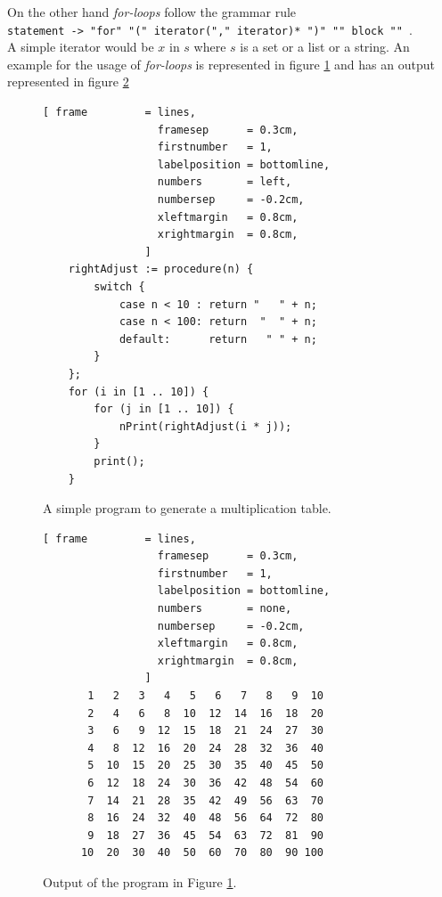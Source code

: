 \documentclass[11pt]{article}
\begin{document}
On the other hand \textsl{for-loops} follow the grammar rule
\\[0.2cm]
\hspace*{1.3cm}
\texttt{statement -> "for" "(" iterator("," iterator)* ")" "{" block "}" }.
\\[0.2cm]
A simple iterator would be $x$ in $s$ where $s$ is a set or a list or a string. An example for the usage of \textsl{for-loops} is represented in figure \ref{fig:multiplication-table.stlx} and has an output represented in figure \ref{fig:multiplication-table}
\begin{figure}[!ht]
\centering
\begin{Verbatim}[ frame         = lines, 
                  framesep      = 0.3cm, 
                  firstnumber   = 1,
                  labelposition = bottomline,
                  numbers       = left,
                  numbersep     = -0.2cm,
                  xleftmargin   = 0.8cm,
                  xrightmargin  = 0.8cm,
                ]
    rightAdjust := procedure(n) {
        switch {
            case n < 10 : return "   " + n;
            case n < 100: return  "  " + n;
            default:      return   " " + n;
        }
    };      
    for (i in [1 .. 10]) {
        for (j in [1 .. 10]) {
            nPrint(rightAdjust(i * j));
        }
        print();
    }
\end{Verbatim}
\vspace*{-0.3cm}
\caption{A simple program to generate a multiplication table.}
\label{fig:multiplication-table.stlx}
\end{figure}

\begin{figure}[!ht]
\centering
\begin{Verbatim}[ frame         = lines, 
                  framesep      = 0.3cm, 
                  firstnumber   = 1,
                  labelposition = bottomline,
                  numbers       = none,
                  numbersep     = -0.2cm,
                  xleftmargin   = 0.8cm,
                  xrightmargin  = 0.8cm,
                ]
       1   2   3   4   5   6   7   8   9  10
       2   4   6   8  10  12  14  16  18  20
       3   6   9  12  15  18  21  24  27  30
       4   8  12  16  20  24  28  32  36  40
       5  10  15  20  25  30  35  40  45  50
       6  12  18  24  30  36  42  48  54  60
       7  14  21  28  35  42  49  56  63  70
       8  16  24  32  40  48  56  64  72  80
       9  18  27  36  45  54  63  72  81  90
      10  20  30  40  50  60  70  80  90 100
\end{Verbatim}
\vspace*{-0.3cm}
\caption{Output of the program in Figure \ref{fig:multiplication-table.stlx}.}
\label{fig:multiplication-table}
\end{figure}
\pagebreak
\end{document}
